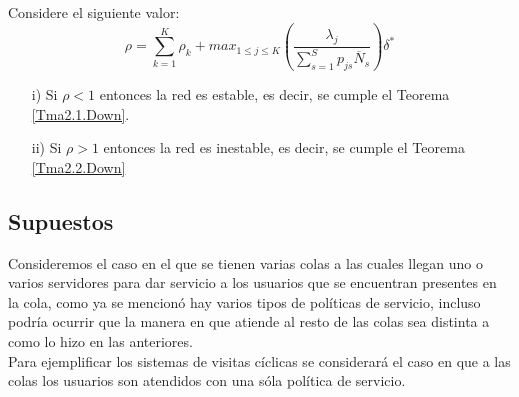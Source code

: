 \begin{Teo}\label{Tma2.3.Down}
Considere el siguiente valor:
\begin{equation}\label{Eq.Rho.1serv}
\rho=\sum_{k=1}^{K}\rho_{k}+max_{1\leq j\leq K}\left(\frac{\lambda_{j}}{\sum_{s=1}^{S}p_{js}\overline{N}_{s}}\right)\delta^{*}
\end{equation}
\begin{itemize}
\item[i)] Si $\rho<1$ entonces la red es estable, es decir, se
cumple el Teorema \ref{Tma2.1.Down}.

\item[ii)] Si $\rho>1$ entonces la red es inestable, es decir, se
cumple el Teorema \ref{Tma2.2.Down}
\end{itemize}
\end{Teo}


\subsection{Supuestos}
Consideremos el caso en el que se tienen varias colas a las cuales
llegan uno o varios servidores para dar servicio a los usuarios
que se encuentran presentes en la cola, como ya se mencion\'o hay
varios tipos de pol\'iticas de servicio, incluso podr\'ia ocurrir
que la manera en que atiende al resto de las colas sea distinta a
como lo hizo en las anteriores.\\

Para ejemplificar los sistemas de visitas c\'iclicas se
considerar\'a el caso en que a las colas los usuarios son atendidos con
una s\'ola pol\'itica de servicio.\\




